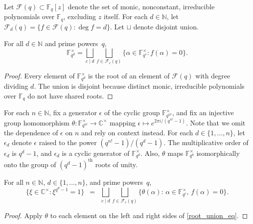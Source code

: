 \documentclass[Unicode,ALCO]{cedram}
\newcommand{\Cbb}{\mathbb{C}}
\newcommand{\F}{\mathbb{F}}
\newcommand{\CF}{\mathcal{F}}
\newcommand{\N}{\mathbb{N}}
\newcommand{\eps}{\epsilon}
\newcommand{\te}{\theta}
\begin{document}
Let \(\CF (q) \subset \F_q[z] \) denote the set of monic, nonconstant, irreducible polynomials over \(\F_q\), excluding \(z\) itself.
For each \(d \in \N\), let \(\CF_d (q) = \{f \in \CF (q) : \deg f = d\}\).
Let \(\sqcup\) denote disjoint union.
\begin{lemma}
\label{root_union}
For all \(d \in \N\) and prime powers~\(q\),
\begin{equation}
\label{root_union_eq}
\F_{q^d}^\times
=
\bigsqcup_{c \mid d}
\bigsqcup_{f \in \CF_c (q)}
\{\alpha \in \F_{q^c}^\times : f(\alpha) = 0\}.
\end{equation}
\end{lemma}
\begin{proof}
Every element of \(\F_{q^d}^\times\) is the root of an element of \(\CF (q)\) with degree dividing \(d\).
The union is disjoint because distinct monic, irreducible polynomials over \(\F_q\) do not have shared roots.
\end{proof}

For each \(n \in \N\), fix a generator \(\eps\) of the cyclic group \(\F_{q^{n!}}^\times\), and fix an injective group homomorphism \(\te : \F_{q^{n!}}^\times \to \Cbb^\times\) mapping \(\eps \mapsto e^{2 \pi i / (q^{n!}-1)}\).
Note that we omit the dependence of \(\eps\) on \(n\)
and rely on context instead.
For each \(d \in \{1,\ldots,n\}\), let \(\eps_d\) denote \(\eps\) raised to the power \( (q^{n!}-1) / (q^d-1)\).
The multiplicative order of \(\eps_d\) is \(q^d-1\), and \(\eps_d\) is a cyclic generator of \(\F_{q^d}^\times\).
Also, \(\te\) maps \(\F_{q^d}^\times\) isomorphically onto the group of \((q^d-1)^\text{th}\) roots of unity.

\begin{corollary}
\label{theta_of_root_union}
For all \(n \in \N\), \(d \in \{1,\ldots,n\}\), and prime powers~\(q\),
\begin{equation}
\label{theta_of_root_union_eq}
\{\xi \in \Cbb^\times : \xi^{q^d-1} = 1\}
\,\,\,
=
\,\,\,
\bigsqcup_{c \mid d}
\bigsqcup_{f \in \CF_c (q)}
\{\te(\alpha) : \, \alpha \in \F_{q^c}^\times, \, f(\alpha) = 0\}.
\end{equation}
\end{corollary}

\begin{proof}
Apply \(\te\) to each element on the left and right sides of \eqref{root_union_eq}.
\end{proof}
\end{document}
